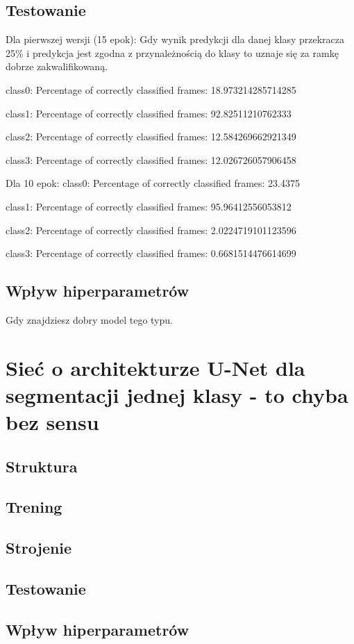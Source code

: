 \subsection{Testowanie}
Dla pierwszej wersji (15 epok):
Gdy wynik predykcji dla danej klasy przekracza 25\% i predykcja jest zgodna z przynależnością do klasy to uznaje się za ramkę dobrze zakwalifikowaną.

class0:
Percentage of correctly classified frames: 18.973214285714285

class1:
Percentage of correctly classified frames: 92.82511210762333

class2:
Percentage of correctly classified frames: 12.584269662921349

class3:
Percentage of correctly classified frames: 12.026726057906458

Dla 10 epok:
class0:
Percentage of correctly classified frames: 23.4375

class1:
Percentage of correctly classified frames: 95.96412556053812

class2:
Percentage of correctly classified frames: 2.0224719101123596

class3:
Percentage of correctly classified frames: 0.6681514476614699
	
\subsection{Wpływ hiperparametrów}
Gdy znajdziesz dobry model tego typu.

\section{Sieć o architekturze U-Net dla segmentacji jednej klasy - to chyba bez sensu}
\subsection{Struktura}
\subsection{Trening}
\subsection{Strojenie}
\subsection{Testowanie}
\subsection{Wpływ hiperparametrów}